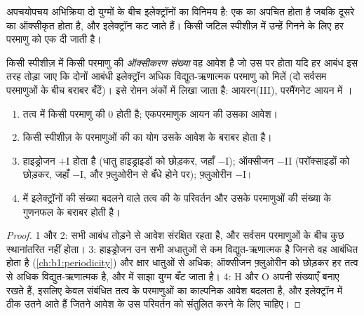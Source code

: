 अपचयोपचय अभिक्रिया दो युग्मों के बीच इलेक्ट्रॉनों का विनिमय है: एक का
 अपचित होता है जबकि दूसरे का  ऑक्सीकृत होता है,
और इलेक्ट्रॉन कट जाते हैं। किसी जटिल स्पीशीज़ में उन्हें गिनने के लिए हर
परमाणु को एक  दी जाती है।

\begin{definition}[ऑक्सीकरण संख्या]\label{def:b1:nernst:oxidation-number}
किसी स्पीशीज़ में किसी परमाणु की \emph{ऑक्सीकरण संख्या}
वह आवेश है जो उस पर होता यदि हर आबंध इस तरह तोड़ा जाए कि
दोनों आबंधी इलेक्ट्रॉन अधिक विद्युत-ऋणात्मक परमाणु को मिलें (दो सर्वसम
परमाणुओं के बीच बराबर बँटें)। इसे रोमन अंकों में लिखा जाता है: आयरन(III),
परमैंगनेट आयन में ।
\end{definition}

\begin{proposition}[ऑक्सीकरण संख्याओं के नियम]\label{prop:b1:nernst:on-rules}
\begin{enumerate}
  \item तत्व में किसी परमाणु की  0 होती है; एकपरमाणुक आयन की
        उसका आवेश।
  \item किसी स्पीशीज़ के परमाणुओं की  का योग उसके
        आवेश के बराबर होता है।
  \item हाइड्रोजन $+$I होता है (धातु हाइड्राइडों को छोड़कर, जहाँ $-$I); ऑक्सीजन
        $-$II (परॉक्साइडों को छोड़कर, जहाँ $-$I, और फ़्लुओरीन से बँधे होने पर); फ़्लुओरीन
        $-$I।
  \item {} में इलेक्ट्रॉनों की संख्या बदलने वाले तत्व की  के
        परिवर्तन और उसके परमाणुओं की संख्या के
        गुणनफल के बराबर होती है।
\end{enumerate}
\end{proposition}

\begin{proof}
1 और 2: सभी आबंध तोड़ने से आवेश संरक्षित रहता है, और सर्वसम परमाणुओं के बीच
कुछ स्थानांतरित नहीं होता। 3: हाइड्रोजन उन सभी अधातुओं से कम विद्युत-ऋणात्मक है
जिनसे वह आबंधित होता है (\cref{ch:b1:periodicity}) और क्षार
धातुओं से अधिक; ऑक्सीजन फ़्लुओरीन को छोड़कर हर तत्व से अधिक विद्युत-ऋणात्मक है,
और  में साझा युग्म बँट जाता है। 4: H और O अपनी संख्याएँ बनाए रखते हैं,
इसलिए केवल संबंधित तत्व के परमाणुओं का काल्पनिक आवेश बदलता है,
और इलेक्ट्रॉन  में ठीक उतने आते हैं जितने आवेश के उस परिवर्तन को
संतुलित करने के लिए चाहिए।
\end{proof}

